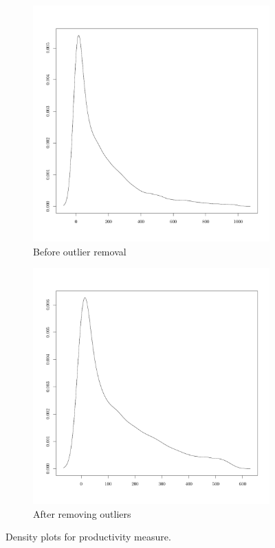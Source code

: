 \begin{figure}[!ht]
    \centering
    \begin{subfigure}[b]{0.3\textwidth}
        \includegraphics[width=\textwidth]{figures/prodInitialDensity.pdf}
        \caption{Before outlier removal}
        \label{fig:prodInitialDensity}
    \end{subfigure}
    \quad
    \begin{subfigure}[b]{0.3\textwidth}
        \includegraphics[width=\textwidth]{figures/prodNoOutDensity.pdf}
        \caption{After removing outliers}
        \label{fig:prodNoOutDensity}
    \end{subfigure}
    \caption{Density plots for productivity measure.}
    \label{fig:productivity}
\end{figure}
